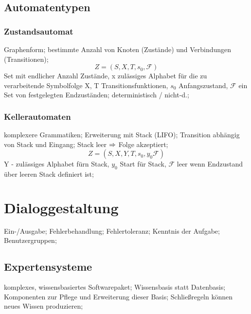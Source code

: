\documentclass[german,color,6pt]{latex4ei/latex4ei_sheet}
\begin{document}
\subsection{Automatentypen}
\begin{sectionbox}
\subsubsection{Zustandsautomat}
Graphenform; bestimmte Anzahl von Knoten (Zustände) und Verbindungen (Transitionen); 
\begin{equation*}
Z = (S, X, T, s_0, \mathcal F )
\end{equation*}
Set mit endlicher Anzahl Zustände, x zulässiges Alphabet für die zu verarbeitende Symbolfolge X, T Transitionsfunktionen, $s_0$ Anfangszustand, $\mathcal F$ ein Set von festgelegten Endzuständen; deterministisch / nicht-d.; 
\end{sectionbox}

\begin{sectionbox}
\subsubsection{Kellerautomaten}
komplexere Grammatiken; Erweiterung mit Stack (LIFO); Transition abhängig von Stack und Eingang; Stack leer $\Rightarrow$ Folge akzeptiert; 
\begin{equation*}
Z = (S, X, Y, T, s_0, y_0 \mathcal F )
\end{equation*}
Y - zulässiges Alphabet fürn Stack, $y_0$ Start für Stack, $\mathcal F$ leer wenn Endzustand über leeren Stack definiert ist; 
\end{sectionbox}

\section{Dialoggestaltung}
\begin{symbolbox}
Ein-/Ausgabe; Fehlerbehandlung; Fehlertoleranz; Kenntnis der Aufgabe; Benutzergruppen; 
\end{symbolbox}

\begin{sectionbox}
\subsection{Expertensysteme}
komplexes, wissensbasiertes Softwarepaket; Wissensbasis statt Datenbasis; Komponenten zur Pflege und Erweiterung dieser Basis; Schließregeln können neues Wissen produzieren; 
\end{sectionbox}
\end{document}
